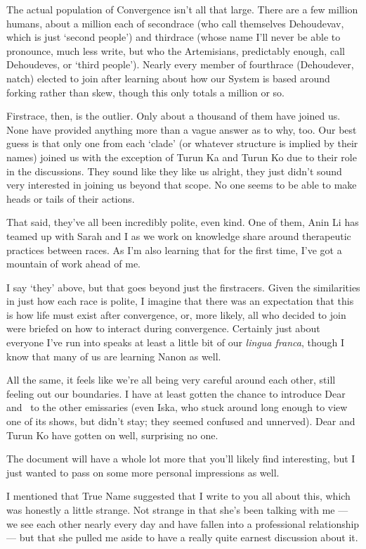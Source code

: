 The actual population of Convergence isn't all that large. There are a few million humans, about a million each of secondrace (who call themselves Dehoudevav, which is just `second people') and thirdrace (whose name I'll never be able to pronounce, much less write, but who the Artemisians, predictably enough, call Dehoudeves, or `third people'). Nearly every member of fourthrace (Dehoudever, natch) elected to join after learning about how our System is based around forking rather than skew, though this only totals a million or so.

Firstrace, then, is the outlier. Only about a thousand of them have joined us. None have provided anything more than a vague answer as to why, too. Our best guess is that only one from each `clade' (or whatever structure is implied by their names) joined us with the exception of Turun Ka and Turun Ko due to their role in the discussions. They sound like they like us alright, they just didn't sound very interested in joining us beyond that scope. No one seems to be able to make heads or tails of their actions.

That said, they've all been incredibly polite, even kind. One of them, Anin Li has teamed up with Sarah and I as we work on knowledge share around therapeutic practices between races. As I'm also learning that for the first time, I've got a mountain of work ahead of me.

I say `they' above, but that goes beyond just the firstracers. Given the similarities in just how each race is polite, I imagine that there was an expectation that this is how life must exist after convergence, or, more likely, all who decided to join were briefed on how to interact during convergence. Certainly just about everyone I've run into speaks at least a little bit of our \emph{lingua franca}, though I know that many of us are learning Nanon as well.

All the same, it feels like we're all being very careful around each other, still feeling out our boundaries. I have at least gotten the chance to introduce Dear and \Partner\ to the other emissaries (even Iska, who stuck around long enough to view one of its shows, but didn't stay; they seemed confused and unnerved). Dear and Turun Ko have gotten on well, surprising no one.

The document will have a whole lot more that you'll likely find interesting, but I just wanted to pass on some more personal impressions as well.

I mentioned that True Name suggested that I write to you all about this, which was honestly a little strange. Not strange in that she's been talking with me — we see each other nearly every day and have fallen into a professional relationship — but that she pulled me aside to have a really quite earnest discussion about it.

